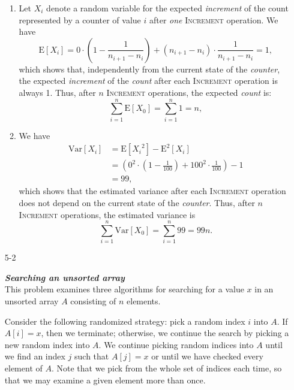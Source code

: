 \begin{enumerate}
\begin{framed}
\begin{enumerate}
\item
Let $X_i$ denote a random variable for the expected \emph{increment} of the
count represented by a counter of value $i$ after \emph{one} \textsc{Increment}
operation. We have
\[
  \text{E}[X_i] = 0 \cdot \left(1 - \frac{1}{n_{i + 1} - n_{i}}\right) + (n_{i + 1} - n_{i}) \cdot \frac{1}{n_{i + 1} - n_{i}} = 1,
\]
which shows that, independently from the current state of the \emph{counter},
the expected \emph{increment} of the \emph{count} after each \textsc{Increment}
operation is always 1. Thus, after $n$ \textsc{Increment} operations, the
expected \emph{count} is:
\[
  \sum_{i = 1}^{n} \text{E}[X_0] = \sum_{i = 1}^{n} 1 = n,
\]

\item We have
\begin{equation*}
\begin{aligned}
  \text{Var}[X_i] &= \text{E}[{X_i}^2] - \text{E}^2[X_i]\\
                  &= \left( 0^2 \cdot \left(1 - \frac{1}{100}\right) + 100^2 \cdot \frac{1}{100} \right) - 1\\
                  &= 99,
\end{aligned}
\end{equation*}
which shows that the estimated variance after each \textsc{Increment} operation
does not depend on the current state of the \emph{counter}. Thus, after $n$
\textsc{Increment} operations, the
estimated variance is
\[
  \sum_{i = 1}^{n} \text{Var}[X_0] = \sum_{i = 1}^{n} 99 = 99n.
\]
\end{enumerate}
\end{framed}

\newpage

\item[5{-}2]{\textbf{\emph{Searching an unsorted array}}\\
This problem examines three algorithms for searching for a value $x$ in an
unsorted array $A$ consisting of $n$ elements.

Consider the following randomized strategy: pick a random index $i$ into $A$. If
$A[i] = x$, then we terminate; otherwise, we continue the search by picking
a new random index into $A$. We continue picking random indices into $A$ until
we find an index $j$ such that $A[j] = x$ or until we have checked every element
of $A$. Note that we pick from the whole set of indices each time, so that we
may examine a given element more than once.

}
\end{enumerate}
